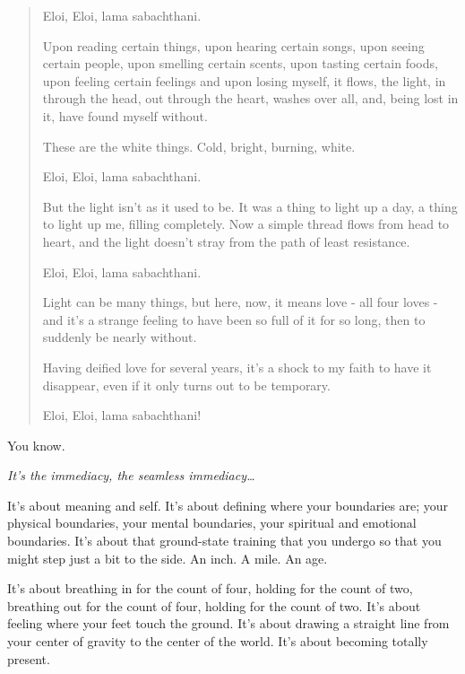 \begin{quotation}
\noindent Eloi, Eloi, lama sabachthani.

Upon reading certain things, upon hearing certain songs, upon seeing certain people, upon smelling certain scents, upon tasting certain foods, upon feeling certain feelings and upon losing myself, it flows, the light, in through the head, out through the heart, washes over all, and, being lost in it, have found myself without.


\noindent These are the white things. Cold, bright, burning, white.

Eloi, Eloi, lama sabachthani.

But the light isn't as it used to be. It was a thing to light up a day, a thing to light up me, filling completely. Now a simple thread flows from head to heart, and the light doesn't stray from the path of least resistance.


\noindent Eloi, Eloi, lama sabachthani.

Light can be many things, but here, now, it means love - all four loves - and it's a strange feeling to have been so full of it for so long, then to suddenly be nearly without.


\noindent Having deified love for several years, it's a shock to my faith to have it disappear, even if it only turns out to be temporary.


\noindent Eloi, Eloi, lama sabachthani!
\end{quotation}
\newpage


\noindent You know.


\emph{It's the immediacy, the seamless immediacy\ldots{}}

\noindent It's about meaning and self. It's about defining where your boundaries are; your physical boundaries, your mental boundaries, your spiritual and emotional boundaries. It's about that ground-state training that you undergo so that you might step just a bit to the side. An inch. A mile. An age.

It's about breathing in for the count of four, holding for the count of two, breathing out for the count of four, holding for the count of two. It's about feeling where your feet touch the ground. It's about drawing a straight line from your center of gravity to the center of the world. It's about becoming totally present.

